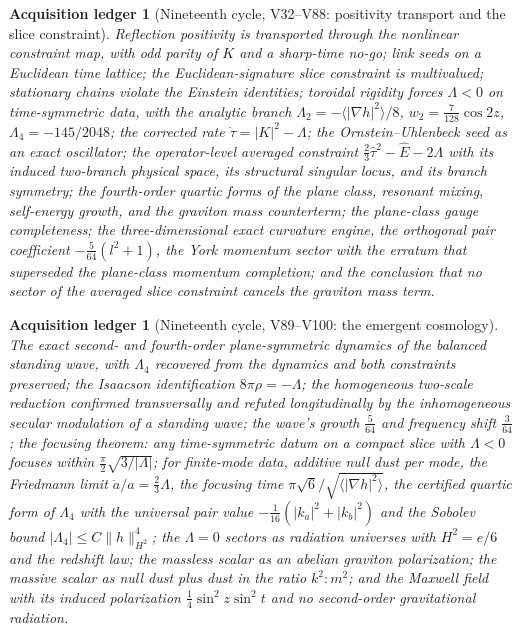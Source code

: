 \documentclass[11pt]{article}
\newtheorem{ledger}[theorem]{Acquisition ledger}
\theoremstyle{remark}
\begin{document}
\begin{ledger}[Nineteenth cycle, V32--V88: positivity transport and the slice constraint]
\label{led:v20v1-middle}
Reflection positivity is transported through the nonlinear constraint
map, with odd parity of \(K\) and a sharp-time no-go; link seeds on a
Euclidean time lattice; the Euclidean-signature slice constraint is
multivalued; stationary chains violate the Einstein identities;
toroidal rigidity forces \(\Lambda<0\) on time-symmetric data, with the
analytic branch \(\Lambda_2=-\langle|\nabla h|^2\rangle/8\),
\(w_2=\tfrac7{128}\cos2z\), \(\Lambda_4=-145/2048\); the corrected rate
\(\dot\tau=|K|^2-\Lambda\); the Ornstein--Uhlenbeck seed as an exact
oscillator; the operator-level averaged constraint
\(\tfrac23\hat\tau^2-\widehat E-2\Lambda\) with its induced two-branch
physical space, its structural singular locus, and its branch symmetry;
the fourth-order quartic forms of the plane class, resonant mixing,
self-energy growth, and the graviton mass counterterm; the plane-class
gauge completeness; the three-dimensional exact curvature engine, the
orthogonal pair coefficient \(-\tfrac5{64}(l^2+1)\), the York momentum
sector with the erratum that superseded the plane-class momentum
completion; and the conclusion that no sector of the averaged slice
constraint cancels the graviton mass term.
\end{ledger}

\begin{ledger}[Nineteenth cycle, V89--V100: the emergent cosmology]
\label{led:v20v1-late}
The exact second- and fourth-order plane-symmetric dynamics of the
balanced standing wave, with \(\Lambda_4\) recovered from the dynamics
and both constraints preserved; the Isaacson identification
\(8\pi\rho=-\Lambda\); the homogeneous two-scale reduction confirmed
transversally and refuted longitudinally by the inhomogeneous secular
modulation of a standing wave; the wave's growth \(\tfrac5{64}\) and
frequency shift \(\tfrac3{64}\); the focusing theorem: any
time-symmetric datum on a compact slice with \(\Lambda<0\) focuses
within \(\tfrac\pi2\sqrt{3/|\Lambda|}\); for finite-mode data,
additive null dust per mode, the Friedmann limit
\(\ddot a/a=\tfrac23\Lambda\), the focusing time
\(\pi\sqrt6/\sqrt{\langle|\nabla h|^2\rangle}\), the certified quartic
form of \(\Lambda_4\) with the universal pair value
\(-\tfrac1{16}(|k_a|^2+|k_b|^2)\) and the Sobolev bound
\(|\Lambda_4|\leq C\|h\|_{H^2}^4\); the \(\Lambda=0\) sectors as
radiation universes with \(H^2=e/6\) and the redshift law; the massless
scalar as an abelian graviton polarization; the massive scalar as null
dust plus dust in the ratio \(k^2:m^2\); and the Maxwell field with its
induced polarization \(\tfrac14\sin^2z\sin^2t\) and no second-order
gravitational radiation.
\end{ledger}
\end{document}
